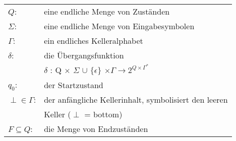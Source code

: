 \documentclass[
    border=0.2cm,
    convert={density=600}
]{standalone}
\begin{document}
\begin{tabular}{lp{11 cm}}
	$Q$: & eine endliche Menge von Zuständen\\
	$\Sigma$: & eine endliche Menge von Eingabesymbolen\\
	$\Gamma$: & ein endliches Kelleralphabet\\
	$\delta$: & die Übergangsfunktion\\
	&$\delta$ : Q $\times$ $\Sigma$ $\cup$ $\lbrace \epsilon\rbrace$ $\times \Gamma \to 2^{Q \times
		\Gamma^*{}}$ \\
	$q_0$:& der Startzustand\\
	$\perp \in \Gamma$: &  der anfängliche Kellerinhalt, symbolisiert den leeren\\
	& Keller ($\perp$ = bottom)\\
	$F \subseteq Q$: & die Menge von Endzuständen
\end{tabular}
\end{document}
